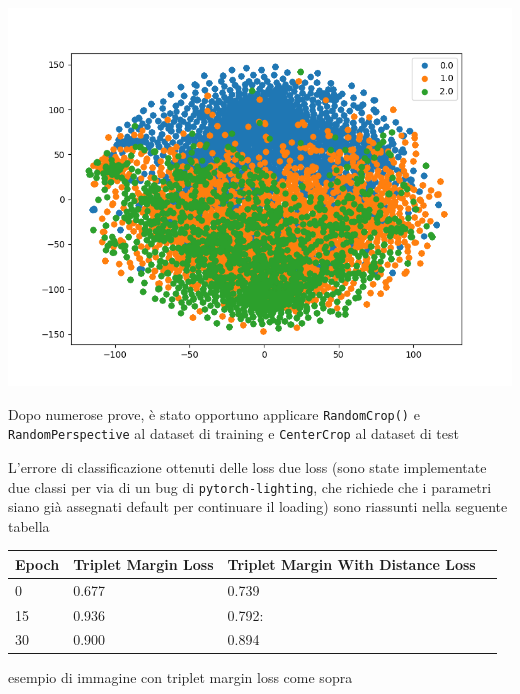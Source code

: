 \documentclass[11pt]{article}
\begin{document}
\begin{center}
\begin{minipage}{0.3\linewidth}
    \includegraphics[width=\linewidth]{09.png}
    \end{minipage}
\end{center}

Dopo numerose prove, è stato opportuno applicare \texttt{RandomCrop()} e \texttt{RandomPerspective} al dataset di training e \texttt{CenterCrop} al dataset di test

L'errore di classificazione ottenuti delle loss due loss (sono state implementate due classi per via di un bug di \texttt{pytorch-lighting},
che richiede che i parametri siano già assegnati default per continuare il loading) sono riassunti nella seguente tabella

\begin{center}
    \begin{tabular}{ | l | l | l | p{5cm} |}
    \hline
    Epoch & Triplet Margin Loss & Triplet Margin With Distance Loss \\ \hline
    0 & 0.677 & 0.739 \\ \hline
    15 & 0.936 & 0.792: \\ \hline
    30 & 0.900 & 0.894  \\
    \hline
    \end{tabular}
\end{center}

\begin{center}
    esempio di immagine con triplet margin loss come sopra
\end{center}
\end{document}
